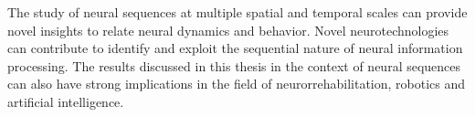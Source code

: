 The study of neural sequences at multiple spatial and temporal scales can provide novel insights to relate neural dynamics and behavior. Novel neurotechnologies can contribute to identify and exploit the sequential nature of neural information processing. The results discussed in this thesis in the context of neural sequences can also have strong implications in the field of neurorrehabilitation, robotics and artificial intelligence. 





